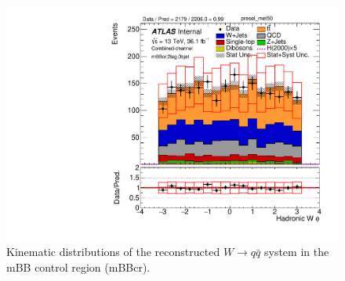 \begin{figure}[!h]
\begin{center}
\includegraphics[scale=0.33]{./figures/boosted/PlotsInMbbCR/DataMC_2tag_0bjet_mbbcr_lepton_presel_met50_WhadPhi}
\caption{Kinematic distributions of the reconstructed $W \to q\bar{q}$ system in the mBB control region (mBBcr).}
\label{fig:boosted_mbbcr_whad}
\end{center}
\end{figure}
 \newpage
